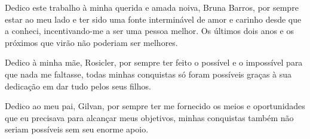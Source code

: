 
Dedico este trabalho à minha querida e amada noiva, Bruna Barros, por sempre estar ao meu lado e ter sido uma fonte interminável de amor e carinho desde que a conheci, incentivando-me a ser uma pessoa melhor. Os últimos dois anos e os próximos que virão não poderiam ser melhores.

Dedico à minha mãe, Rosicler, por sempre ter feito o possível e o impossível para que nada me faltasse, todas minhas conquistas só foram possíveis graças à sua dedicação em dar tudo pelos seus filhos.

Dedico ao meu pai, Gilvan, por sempre ter me fornecido os meios e oportunidades que eu precisava para alcançar meus objetivos, minhas conquistas também não seriam possíveis sem seu enorme apoio.
